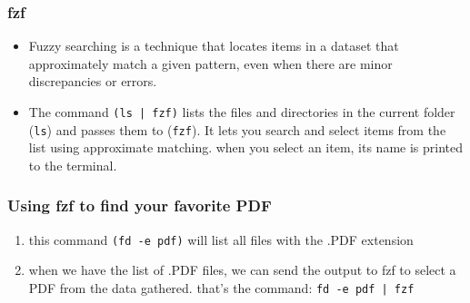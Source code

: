 \documentclass{article}
\begin{document}
        \subsubsection{fzf}
        \begin{itemize}
            \item Fuzzy searching is a technique that locates items in a dataset that approximately match a given pattern, even when there are minor discrepancies or errors.
            \item The command \texttt{(ls | fzf)} lists the files and directories in the current folder (\texttt{ls}) and passes them to (\texttt{fzf}). It lets you search and select items from the list using approximate matching. when you select an item, its name is printed to the terminal.
        \end{itemize}
        \subsubsection{Using fzf to find your favorite PDF}
        \begin{enumerate}
            \item this command \texttt{(fd -e pdf)} will list all files with the .PDF extension
            \item when we have the list of .PDF files, we can send the output to fzf to select a PDF from the data gathered. that’s the command: \texttt{fd -e pdf | fzf}
        \end{enumerate}

        
\end{document}
